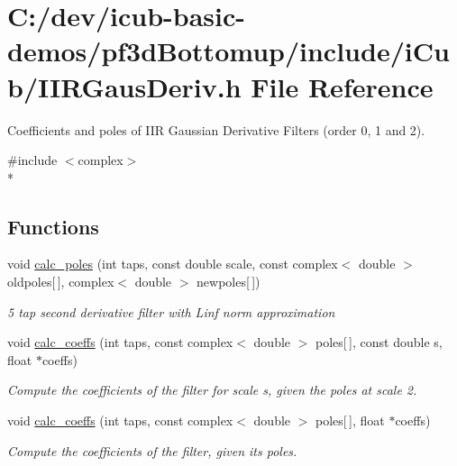 \section{C\+:/dev/icub-\/basic-\/demos/pf3d\+Bottomup/include/i\+Cub/\+I\+I\+R\+Gaus\+Deriv.h File Reference}
\label{IIRGausDeriv_8h}


Coefficients and poles of I\+IR Gaussian Derivative Filters (order 0, 1 and 2).  


{\ttfamily \#include $<$complex$>$}\\*
\subsection*{Functions}
\begin{DoxyCompactItemize}
\item 
void \hyperlink{IIRGausDeriv_8h_a2741eb625282f8d68ba971a4431407a5}{calc\+\_\+poles} (int taps, const double scale, const complex$<$ double $>$ oldpoles\mbox{[}$\,$\mbox{]}, complex$<$ double $>$ newpoles\mbox{[}$\,$\mbox{]})
\begin{DoxyCompactList}\small\item\em 5 tap second derivative filter with Linf norm approximation \end{DoxyCompactList}\item 
void \hyperlink{IIRGausDeriv_8h_a3e168333285d90a0bfd848d9791ca427}{calc\+\_\+coeffs} (int taps, const complex$<$ double $>$ poles\mbox{[}$\,$\mbox{]}, const double s, float $\ast$coeffs)
\begin{DoxyCompactList}\small\item\em Compute the coefficients of the filter for scale s, given the poles at scale 2. \end{DoxyCompactList}\item 
void \hyperlink{IIRGausDeriv_8h_a3e7f009d38086e228c6ba8b3e5b6055f}{calc\+\_\+coeffs} (int taps, const complex$<$ double $>$ poles\mbox{[}$\,$\mbox{]}, float $\ast$coeffs)
\begin{DoxyCompactList}\small\item\em Compute the coefficients of the filter, given its poles. \end{DoxyCompactList}\end{DoxyCompactItemize}
